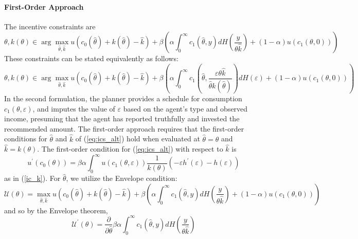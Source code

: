 \documentclass[11pt]{article}
\newcommand{\p}{\prime}
\newcommand{\U}{\mathcal{U}}
\begin{document}
\paragraph{First-Order Approach} 
The incentive constraints are 
\begin{equation}
    \theta, k(\theta)\in\arg\max_{\hat{\theta},\hat{k}}u\left( c_0(\hat{\theta}) + k(\hat{\theta}) - \hat{k} \right) + \beta\left( \alpha\int_{0}^{\infty}c_1(\hat{\theta},y)dH\left( \frac{y}{\theta \hat{k}} \right) + (1 - \alpha)u\left( c_1\left( \theta,0 \right) \right) \right) \label{eq:ics_app}
\end{equation}
These constraints can be stated equivalently as follows:
\begin{equation}
    \theta, k(\theta)\in\arg\max_{\hat{\theta},\hat{k}}u\left( c_0(\hat{\theta}) + k(\hat{\theta}) - \hat{k} \right) + \beta\left( \alpha\int_{0}^{\infty}c_1\left(\hat{\theta},\frac{\varepsilon\theta\hat{k}}{\hat{\theta}k\left( \hat{\theta}\right)} \right)dH\left( \varepsilon \right) + (1 - \alpha)u\left( c_1\left( \theta,0 \right) \right) \right) \label{eq:ics_alt}
\end{equation}
In the second formulation, the planner provides a schedule for consumption \( c_1(\theta,\varepsilon) \), and imputes the value of \( \varepsilon \) based on the agent's type and observed income, presuming that the agent has reported truthfully and invested the recommended amount. The first-order approach requires that the first-order conditions for \( \hat{\theta} \) and \( \hat{k} \) of (\ref{eq:ics_alt}) hold when evaluated at \( \hat{\theta}=\theta \) and \( \hat{k} = k(\theta) \). The first-order condition for (\ref{eq:ics_alt}) with respect to \( \hat{k} \) is 
\begin{equation}
    u^\p (c_0(\theta)) = \beta\alpha\int_{0}^{\infty}u\left( c_1\left( \theta,\varepsilon \right) \right) \frac{1}{k(\theta)}\left( -\varepsilon h^\p (\varepsilon)-h(\varepsilon) \right) \label{eq:icsk_app}
\end{equation}
as in (\ref{ic_k}). For \( \hat{\theta} \), we utilize the Envelope condition:
\begin{equation}
    \U(\theta) = \max_{\hat{\theta},\hat{k}}u\left( c_0(\hat{\theta}) + k(\hat{\theta}) - \hat{k} \right) + \beta\left( \alpha\int_{0}^{\infty}c_1(\hat{\theta},y)dH\left( \frac{y}{\theta \hat{k}} \right) + (1 - \alpha)u\left( c_1\left( \theta,0 \right) \right) \right) 
\end{equation}
and so by the Envelope theorem,
\begin{equation}
    \U^\p(\theta) = \frac{\partial}{\partial \hat{\theta}}\beta\alpha\int_{0}^{\infty}c_1(\hat{\theta},y)dH\left( \frac{y}{\theta \hat{k}} \right) \label{eq:env1}
\end{equation}
\end{document}
